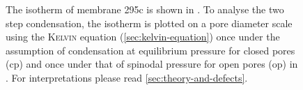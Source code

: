 \documentclass[../../../thesis.tex]{subfiles}
\begin{document}
\begin{figure}[tb]
{
        \label{fig:295c-op-cp}
      }
      \caption{The isotherm of membrane 295c is shown in \protect{}. To analyse the two step condensation, the isotherm is plotted on a pore diameter scale using the \textsc{Kelvin} equation (\cref{sec:kelvin-equation}) once under the assumption of condensation at equilibrium pressure for closed pores (cp) and once under that of spinodal pressure for open pores (op) in \protect{}. For interpretations please read \cref{sec:theory-and-defects}.}
      \label{fig:295c-analysis}
  \end{figure}
\end{document}
